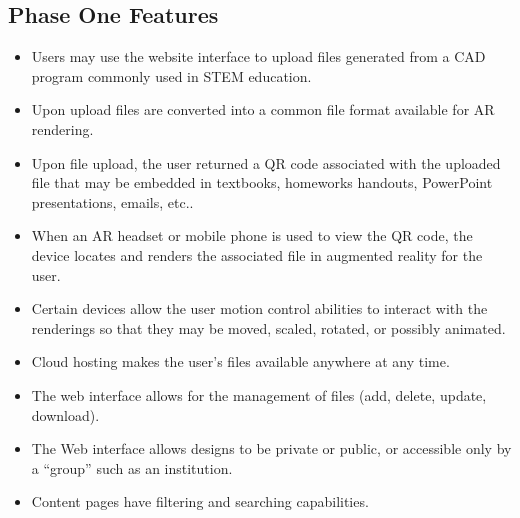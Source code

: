 \subsection{Phase One Features}
\begin{itemize}
	\item Users may use the website interface to upload files generated from a CAD program commonly used in STEM education. 
	\item  Upon upload files are converted into a common file format available for AR rendering. 
	\item Upon file upload, the user returned a QR code associated with the uploaded file that may be embedded in textbooks, homeworks handouts, PowerPoint presentations, emails, etc..
	\item When an AR headset or mobile phone is used to view the QR code, the device locates and renders the associated file in augmented reality for the user.  
	\item Certain devices allow the user motion control abilities to interact with the renderings so that they may be moved, scaled, rotated, or possibly animated. 
	\item Cloud hosting makes the user’s files available anywhere at any time. 
	\item The web interface allows for the management of files (add, delete, update, download). 
	\item The Web interface allows designs to be private or public, or accessible only by a “group” such as an institution.
	\item Content pages have filtering and searching capabilities.
\end{itemize}

